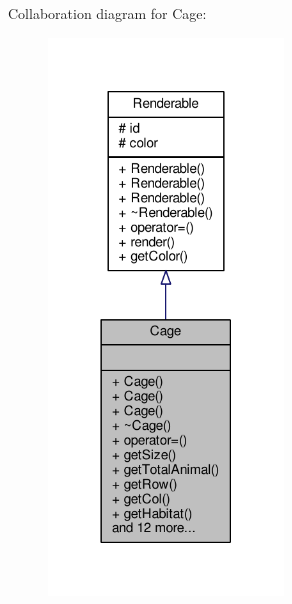 Collaboration diagram for Cage\+:
\nopagebreak
\begin{figure}[H]
\begin{center}
\leavevmode
\includegraphics[width=177pt]{classCage__coll__graph}
\end{center}
\end{figure}
